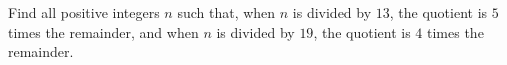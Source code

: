 Find all positive integers $n$ such that, when $n$ is divided by $13$, the quotient is $5$ times the remainder, and when $n$ is divided by $19$, the quotient is $4$ times the remainder.
